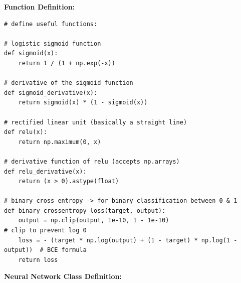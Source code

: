 \documentclass[a4paper]{article}
\begin{document}
\newpage
\textbf{Function Definition:}
\begin{lstlisting}[basicstyle= \scriptsize]
# define useful functions:

# logistic sigmoid function
def sigmoid(x):
    return 1 / (1 + np.exp(-x))

# derivative of the sigmoid function
def sigmoid_derivative(x):
    return sigmoid(x) * (1 - sigmoid(x))

# rectified linear unit (basically a straight line)
def relu(x):
    return np.maximum(0, x)

# derivative function of relu (accepts np.arrays)
def relu_derivative(x):
    return (x > 0).astype(float)

# binary cross entropy -> for binary classification between 0 & 1
def binary_crossentropy_loss(target, output):
    output = np.clip(output, 1e-10, 1 - 1e-10)                              # clip to prevent log 0
    loss = - (target * np.log(output) + (1 - target) * np.log(1 - output))  # BCE formula
    return loss    
\end{lstlisting}

\textbf{Neural Network Class Definition:}
\end{document}
